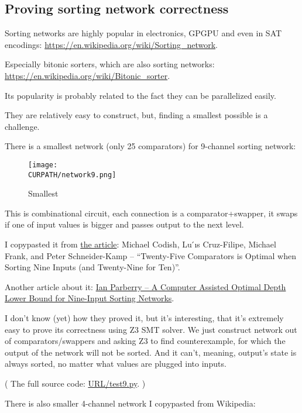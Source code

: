 \subsection{Proving sorting network correctness}

\renewcommand{\CURPATH}{proofs/sorting_network}

Sorting networks are highly popular in electronics, GPGPU and even in SAT encodings:
\url{https://en.wikipedia.org/wiki/Sorting_network}.

Especially bitonic sorters, which are also sorting networks:
\url{https://en.wikipedia.org/wiki/Bitonic_sorter}.

Its popularity is probably related to the fact they can be parallelized easily.

They are relatively easy to construct, but, finding a smallest possible is a challenge.

There is a smallest network (only 25 comparators) for 9-channel sorting network:

\begin{figure}[H]
\centering
\texttt{[image: \\CURPATH/network9.png]}
\caption{Smallest}
\end{figure}

This is combinational circuit, each connection is a comparator+swapper, it swaps if one of input values is bigger and passes output to the next level.

I copypasted it from \href{https://arxiv.org/pdf/1405.5754.pdf}{the article}:
Michael Codish, Lu ́ıs Cruz-Filipe, Michael Frank, and Peter Schneider-Kamp --
``Twenty-Five Comparators is Optimal when Sorting Nine Inputs (and Twenty-Nine for Ten)''.

Another article about it: \href{http://larc.unt.edu/ian/pubs/9-input.pdf}{Ian Parberry -- A Computer Assisted Optimal Depth Lower Bound for Nine-Input Sorting Networks}.

I don't know (yet) how they proved it, but it's interesting, that it's extremely easy to prove its correctness using Z3 SMT solver.
We just construct network out of comparators/swappers and asking Z3 to find counterexample, for which the output of the network will not be sorted.
And it can't, meaning, output's state is always sorted, no matter what values are plugged into inputs.



( The full source code: \url{URL/test9.py}. )

There is also smaller 4-channel network I copypasted from Wikipedia:

